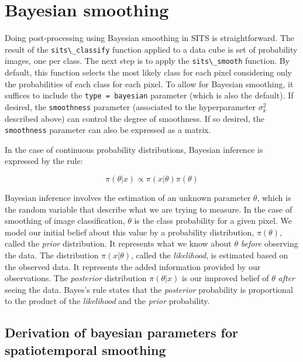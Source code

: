 \documentclass[
  11pt,
]{report}
\newcommand{\passthrough}[1]{#1}
\begin{document}
\hypertarget{bayesian-smoothing-1}{%
\section{Bayesian smoothing}\label{bayesian-smoothing-1}}

Doing post-processing using Bayesian smoothing in SITS is
straightforward. The result of the
\passthrough{\lstinline!sits\_classify!} function applied to a data cube
is set of probability images, one per class. The next step is to apply
the \passthrough{\lstinline!sits\_smooth!} function. By default, this
function selects the most likely class for each pixel considering only
the probabilities of each class for each pixel. To allow for Bayesian
smoothing, it suffices to include the
\passthrough{\lstinline!type = bayesian!} parameter (which is also the
default). If desired, the \passthrough{\lstinline!smoothness!} parameter
(associated to the hyperparameter \(\sigma^2_k\) described above) can
control the degree of smoothness. If so desired, the
\passthrough{\lstinline!smoothness!} parameter can also be expressed as
a matrix.

In the case of continuous probability distributions, Bayesian inference
is expressed by the rule:

\[
\pi(\theta|x) \propto \pi(x|\theta)\pi(\theta)
\]

Bayesian inference involves the estimation of an unknown parameter
\(\theta\), which is the random variable that describe what we are
trying to measure. In the case of smoothing of image classification,
\(\theta\) is the class probability for a given pixel. We model our
initial belief about this value by a probability distribution,
\(\pi(\theta)\), called the \emph{prior} distribution. It represents
what we know about \(\theta\) \emph{before} observing the data. The
distribution \(\pi(x|\theta)\), called the \emph{likelihood}, is
estimated based on the observed data. It represents the added
information provided by our observations. The \emph{posterior}
distribution \(\pi(\theta|x)\) is our improved belief of \(\theta\)
\emph{after} seeing the data. Bayes's rule states that the
\emph{posterior} probability is proportional to the product of the
\emph{likelihood} and the \emph{prior} probability.

\hypertarget{derivation-of-bayesian-parameters-for-spatiotemporal-smoothing}{%
\subsection{Derivation of bayesian parameters for spatiotemporal
smoothing}\label{derivation-of-bayesian-parameters-for-spatiotemporal-smoothing}}
\end{document}
